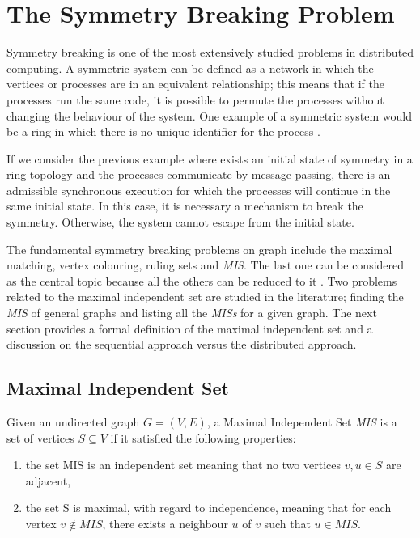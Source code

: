 \section{The Symmetry Breaking Problem}
\label{cap:2}


Symmetry breaking is one of the most extensively studied problems in distributed computing. A symmetric system can be defined as a network in which the vertices or processes are in an equivalent relationship; this means that if the processes run the same code, it is possible to permute the processes without changing the behaviour of the system. One example of a symmetric system would be a ring in which there is no unique identifier for the process \cite{boldi1996symmetry}.  

If we consider the previous example where exists an initial state of symmetry in a ring topology and the processes communicate by message passing, there is an admissible synchronous execution for which the processes will continue in the same initial state. In this case, it is necessary a mechanism to break the symmetry. Otherwise, the system cannot escape from the initial state.

The fundamental symmetry breaking problems on graph include the maximal matching, vertex colouring, ruling sets and \textit{MIS}. The last one can be considered as the central topic because all the others can be reduced to it \cite{linial1992locality}. Two problems related to the maximal independent set are studied in the literature; finding the \textit{MIS} of general graphs and listing all the \textit{MISs} for a given graph. The next section provides a formal definition of the maximal independent set and a discussion on the sequential approach versus the distributed approach.

\subsection{Maximal Independent Set}

\theoremstyle{definition}
\begin{definition}

Given an undirected graph $G = (V,E)$, a Maximal Independent Set \textit{MIS} is a set of vertices $S \subseteq V$ if it satisfied the following properties:   

\begin{enumerate}
  \item the set MIS is an independent set meaning that no two vertices $v,u \in S$ are adjacent,
  \item the set S is maximal, with regard to independence, meaning that for each vertex $v \notin MIS$, there exists a neighbour $u$ of $v$ such that $u \in MIS$.
\end{enumerate}

\end{definition}

